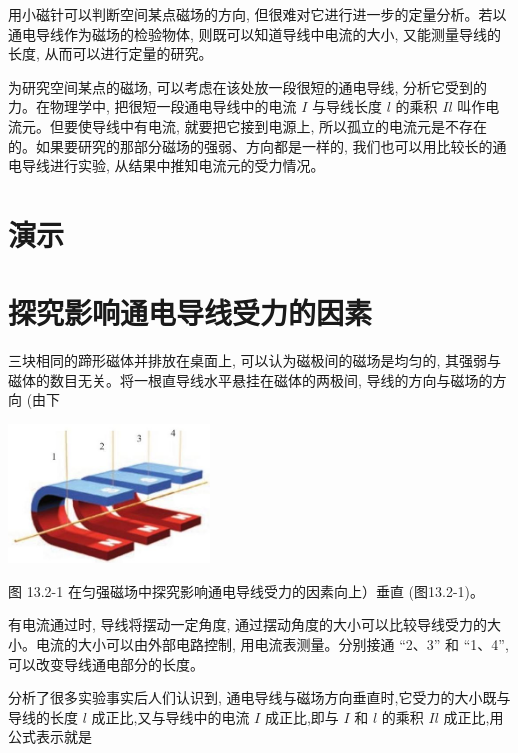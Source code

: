 \documentclass[10pt]{article}
\begin{document}
用小磁针可以判断空间某点磁场的方向, 但很难对它进行进一步的定量分析。若以通电导线作为磁场的检验物体, 则既可以知道导线中电流的大小, 又能测量导线的长度, 从而可以进行定量的研究。

为研究空间某点的磁场, 可以考虑在该处放一段很短的通电导线, 分析它受到的力。在物理学中, 把很短一段通电导线中的电流 \(I\) 与导线长度 \(l\) 的乘积 \({Il}\) 叫作电流元。但要使导线中有电流, 就要把它接到电源上, 所以孤立的电流元是不存在的。如果要研究的那部分磁场的强弱、方向都是一样的, 我们也可以用比较长的通电导线进行实验, 从结果中推知电流元的受力情况。

\section*{演示}

\section*{探究影响通电导线受力的因素}

三块相同的蹄形磁体并排放在桌面上, 可以认为磁极间的磁场是均匀的, 其强弱与磁体的数目无关。将一根直导线水平悬挂在磁体的两极间, 导线的方向与磁场的方向 (由下

\begin{center}
\includegraphics[max width=0.4\textwidth]{images/01911d5f-8e38-70c0-b5b8-2b399bd115b6_115_606097.jpg}
\end{center}

\begin{mdframed}

图 13.2-1 在匀强磁场中探究影响通电导线受力的因素向上）垂直 (图13.2-1)。

\end{mdframed}

有电流通过时, 导线将摆动一定角度, 通过摆动角度的大小可以比较导线受力的大小。电流的大小可以由外部电路控制, 用电流表测量。分别接通 “2、3” 和 “1、4”, 可以改变导线通电部分的长度。

分析了很多实验事实后人们认识到, 通电导线与磁场方向垂直时,它受力的大小既与导线的长度 \(l\) 成正比,又与导线中的电流 \(I\) 成正比,即与 \(I\) 和 \(l\) 的乘积 \({Il}\) 成正比,用公式表示就是
\end{document}
